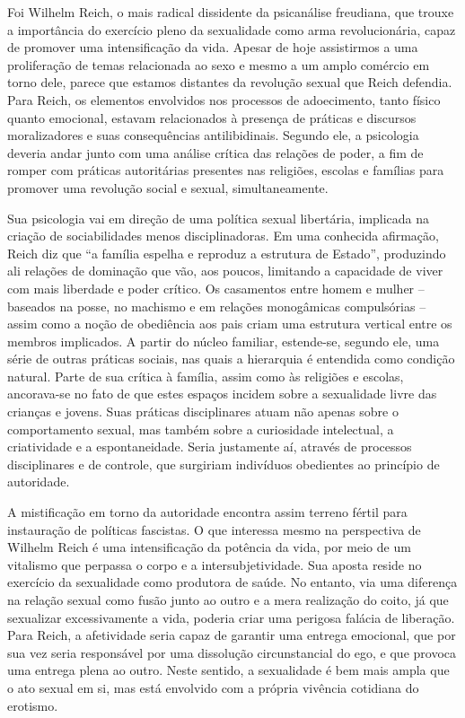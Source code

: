 Foi Wilhelm Reich, o mais radical dissidente da psicanálise freudiana,
que trouxe a importância do exercício pleno da sexualidade como arma
revolucionária, capaz de promover uma intensificação da vida. Apesar de
hoje assistirmos a uma proliferação de temas relacionada ao sexo e mesmo
a um amplo comércio em torno dele, parece que estamos distantes da
revolução sexual que Reich defendia. Para Reich, os elementos envolvidos
nos processos de adoecimento, tanto físico quanto emocional, estavam
relacionados à presença de práticas e discursos moralizadores e suas
consequências antilibidinais. Segundo ele, a psicologia deveria andar
junto com uma análise crítica das relações de poder, a fim de romper com
práticas autoritárias presentes nas religiões, escolas e famílias para
promover uma revolução social e sexual, simultaneamente.

Sua psicologia vai em direção de uma política sexual libertária,
implicada na criação de sociabilidades menos disciplinadoras. Em uma
conhecida afirmação, Reich diz que ``a família espelha e reproduz a
estrutura de Estado'', produzindo ali relações de dominação que vão, aos
poucos, limitando a capacidade de viver com mais liberdade e poder
crítico. Os casamentos entre homem e mulher -- baseados na posse, no
machismo e em relações monogâmicas compulsórias -- assim como a noção de
obediência aos pais criam uma estrutura vertical entre os membros
implicados. A partir do núcleo familiar, estende-se, segundo ele, uma
série de outras práticas sociais, nas quais a hierarquia é entendida
como condição natural. Parte de sua crítica à família, assim como às
religiões e escolas, ancorava-se no fato de que estes espaços incidem
sobre a sexualidade livre das crianças e jovens. Suas práticas
disciplinares atuam não apenas sobre o comportamento sexual, mas também
sobre a curiosidade intelectual, a criatividade e a espontaneidade.
Seria justamente aí, através de processos disciplinares e de controle,
que surgiriam indivíduos obedientes ao princípio de autoridade.

A mistificação em torno da autoridade encontra assim terreno fértil para
instauração de políticas fascistas. O que interessa mesmo na perspectiva
de Wilhelm Reich é uma intensificação da potência da vida, por meio de
um vitalismo que perpassa o corpo e a intersubjetividade. Sua aposta
reside no exercício da sexualidade como produtora de saúde. No entanto,
via uma diferença na relação sexual como fusão junto ao outro e a mera
realização do coito, já que sexualizar excessivamente a vida, poderia
criar uma perigosa falácia de liberação. Para Reich, a afetividade seria
capaz de garantir uma entrega emocional, que por sua vez seria
responsável por uma dissolução circunstancial do ego, e que provoca uma
entrega plena ao outro. Neste sentido, a sexualidade é bem mais ampla
que o ato sexual em si, mas está envolvido com a própria vivência
cotidiana do erotismo.

